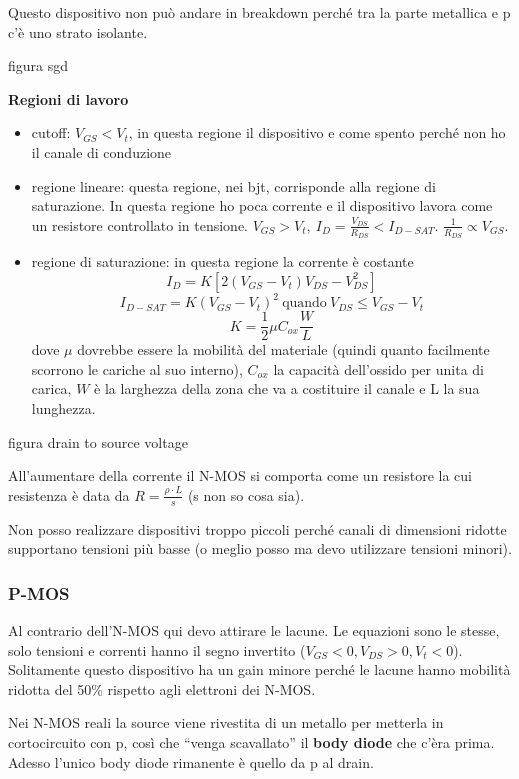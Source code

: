 \documentclass[
]{article}
\providecommand{\tightlist}{%
  \setlength{\itemsep}{0pt}\setlength{\parskip}{0pt}}
\begin{document}
Questo dispositivo non può andare in breakdown perché tra la parte
metallica e p c'è uno strato isolante.

figura sgd

\textbf{Regioni di lavoro}

\begin{itemize}
\tightlist
\item
  cutoff: \(V_{GS}<V_{t}\), in questa regione il dispositivo e come
  spento perché non ho il canale di conduzione
\item
  regione lineare: questa regione, nei bjt, corrisponde alla regione di
  saturazione. In questa regione ho poca corrente e il dispositivo
  lavora come un resistore controllato in tensione. \(V_{GS}>V_{t},\
  I_{D}=\frac{V_{DS}}{R_{DS}}<I_{D-SAT}\).
  \(\frac{1}{R_{DS}}\propto V_{GS}\).
\item
  regione di saturazione: in questa regione la corrente è costante
  \[I_{D}
  = K[2(V_{GS}-V_{t})V_{DS}-V_{DS}^{2}]\]
  \[I_{D-SAT} = K(V_{GS}-V_{t})^{2}\ \text{quando}\
  V_{DS}\leq V_{GS}-V_{t}\] \[K = \frac{1}{2}\mu C_{ox}\frac{W}{L}\]
  dove \(\mu\) dovrebbe essere la mobilità del materiale (quindi quanto
  facilmente scorrono le cariche al suo interno), \(C_{ox}\) la capacità
  dell'ossido per unita di carica, \(W\) è la larghezza della zona che
  va a costituire il canale e L la sua lunghezza.
\end{itemize}

figura drain to source voltage

All'aumentare della corrente il N-MOS si comporta come un resistore la
cui resistenza è data da \(R=\frac{\rho\cdot L}{s}\) (s non so cosa
sia).

Non posso realizzare dispositivi troppo piccoli perché canali di
dimensioni ridotte supportano tensioni più basse (o meglio posso ma devo
utilizzare tensioni minori).

\subsubsection{P-MOS}\label{p-mos}

Al contrario dell'N-MOS qui devo attirare le lacune. Le equazioni sono
le stesse, solo tensioni e correnti hanno il segno invertito
(\(V_{GS}<0,V_{DS}>0,V_{t}<0\)). Solitamente questo dispositivo ha un
gain minore perché le lacune hanno mobilità ridotta del 50\% rispetto
agli elettroni dei N-MOS.

Nei N-MOS reali la source viene rivestita di un metallo per metterla in
cortocircuito con p, così che ``venga scavallato'' il \textbf{body
diode} che c'èra prima. Adesso l'unico body diode rimanente è quello da
p al drain.
\end{document}
